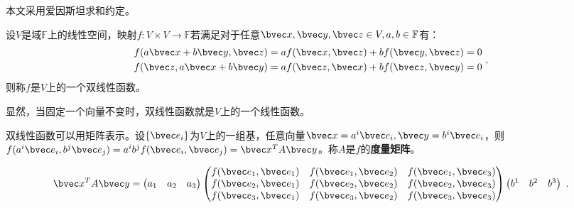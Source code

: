 本文采用爱因斯坦求和约定。

\begin{definition}{}
设$V$是域$\mathbb F$上的线性空间，映射$f:V\times V\rightarrow\mathbb F$若满足对于任意$\bvec x,\bvec y,\bvec z \in V,a,b\in \mathbb F$有：
\begin{equation}
\begin{aligned}
f(a\bvec x+b\bvec y,\bvec z)&=af(\bvec x,\bvec z)+bf(\bvec y,\bvec z)=0\\
f(\bvec z,a\bvec x+b\bvec y)&=af(\bvec z,\bvec  x)+bf(\bvec z,\bvec y)=0
\end{aligned}~,
\end{equation}
则称$f$是$V$上的一个双线性函数。
\end{definition}

显然，当固定一个向量不变时，双线性函数就是$V$上的一个线性函数。

双线性函数可以用矩阵表示。设$\{\bvec e_i\}$为$V$上的一组基，任意向量$\bvec x=a^i\bvec e_i,\bvec y=b^i\bvec e_i$，则$f(a^i\bvec e_i,b^j\bvec e_j)=a^ib^jf(\bvec e_i,\bvec e_j)=\bvec x^TA\bvec y$。称$A$是$f$的\textbf{度量矩阵}。
\begin{example}{}
\begin{equation}
\bvec x^TA\bvec y=\begin{pmatrix}
 a_1 &a_2  &a_3
\end{pmatrix}
\begin{pmatrix}
  f(\bvec e_1,\bvec e_1)& f(\bvec e_1,\bvec e_2) &f(\bvec e_1,\bvec e_3) \\
 f(\bvec e_2,\bvec e_1) &f(\bvec e_2,\bvec e_2)  &f(\bvec e_2,\bvec e_3) \\
 f(\bvec e_3,\bvec e_1) & f(\bvec e_3,\bvec e_2) &f(\bvec e_3,\bvec e_3)
\end{pmatrix}
 \begin{pmatrix}
 b^1 &b^2  &b^3
\end{pmatrix}~.
\end{equation}
\end{example}
